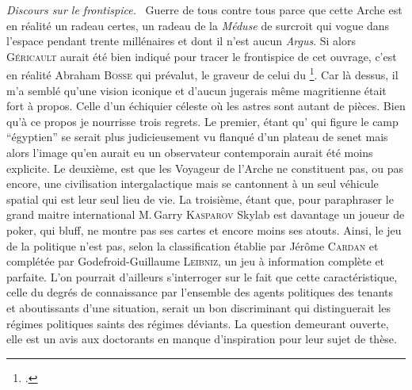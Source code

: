 {\em\normalsize Discours sur le frontispice.}~
Guerre de tous contre tous parce que cette Arche est en réalité un radeau certes, un radeau de la \emph{Méduse} de surcroit qui vogue dans l’espace pendant trente millénaires et dont il n’est aucun \emph{Argus}. Si alors \textsc{Géricault} aurait été bien indiqué pour tracer le frontispice de cet ouvrage, c’est en réalité Abraham \textsc{Bosse} qui prévalut, le graveur de celui du \footcite{leviathan}. Car là dessus, il m’a semblé qu’une vision iconique et d’aucun jugerais même magritienne était fort à propos. Celle d’un échiquier céleste où les astres sont autant de pièces. Bien qu’à ce propos je nourrisse trois regrets. Le premier, étant qu’\elena{} qui figure le camp \enquote{égyptien} se serait plus judicieusement vu flanqué d’un plateau de senet mais alors l’image qu’en aurait eu un observateur contemporain aurait été moins explicite. Le deuxième, est que les Voyageur de l’Arche ne constituent pas, ou pas encore, une civilisation intergalactique mais se cantonnent à un seul véhicule spatial qui est leur seul lieu de vie. La troisième, étant que, pour paraphraser le grand maitre international M.\,Garry \textsc{Kasparov}  \elena{} Skylab est davantage un joueur de poker, qui bluff, ne montre pas ses cartes et encore moins ses atouts. Ainsi, le jeu de la politique n’est pas, selon la classification établie par Jérôme \textsc{Cardan} et complétée par Godefroid-Guillaume \textsc{Leibniz}, un jeu à information complète et parfaite. L’on pourrait d’ailleurs s’interroger sur le fait que cette caractéristique, celle du degrés de  connaissance par l’ensemble des agents politiques des tenants et aboutissants d’une situation, serait  un bon discriminant qui distinguerait les régimes politiques saints des régimes déviants. La question demeurant ouverte, elle est un avis aux doctorants en manque d’inspiration pour leur sujet de thèse.

